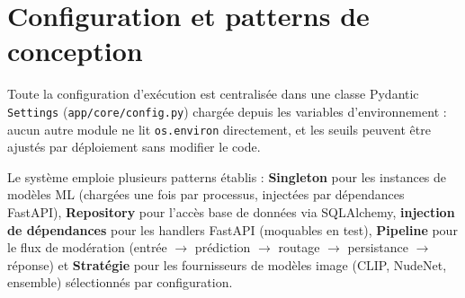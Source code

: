 \section{Configuration et patterns de conception}

Toute la configuration d'exécution est centralisée dans une classe Pydantic \texttt{Settings} (\texttt{app/core/config.py}) chargée depuis les variables d'environnement : aucun autre module ne lit \texttt{os.environ} directement, et les seuils peuvent être ajustés par déploiement sans modifier le code.

Le système emploie plusieurs patterns établis : \textbf{Singleton} pour les instances de modèles ML (chargées une fois par processus, injectées par dépendances FastAPI), \textbf{Repository} pour l'accès base de données via SQLAlchemy, \textbf{injection de dépendances} pour les handlers FastAPI (moquables en test), \textbf{Pipeline} pour le flux de modération (entrée $\to$ prédiction $\to$ routage $\to$ persistance $\to$ réponse) et \textbf{Stratégie} pour les fournisseurs de modèles image (CLIP, NudeNet, ensemble) sélectionnés par configuration.
